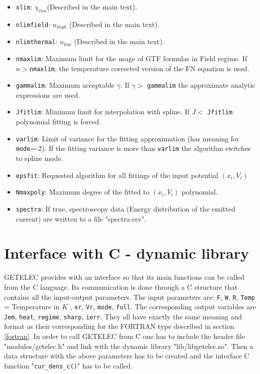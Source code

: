 \documentclass[notitlepage
]{revtex4-1}
\begin{document}
\begin{itemize}
	\item \texttt{xlim}:  $\chi_{lim}$(Described in the main text).
	\item \texttt{nlimfield}: $n_{high}$ (Described in the main text).
	\item \texttt{nlimthermal}: $n_{low}$ (Described in the main text).
	\item \texttt{nmaxlim}: Maximum limit for the usage of GTF formulas in Field regime. If $n>$\texttt{nmaxlim}, the temperature corrected version of the FN equation is used.
	\item \texttt{gammalim}: Maximum acceptable $\gamma$. If $\gamma>$ \texttt{gammalim} the approximate analytic expressions are used. 
	\item \texttt{Jfitlim}: Minimum limit for interpolation with spline. If $J<$ \texttt{Jfitlim} polynomial fitting is forced.
	\item \texttt{varlim}: Limit of variance for the fitting approximation (has meaning for \texttt{mode}=-2). If the fitting variance is more than \texttt{varlim} the algorithm switches to spline mode.
	\item \texttt{epsfit}: Requested algorithm for all fittings of the input potential $(x_i, V_i)$
	\item \texttt{Nmaxpoly}: Maximum degree of the fitted to $(x_i, V_i)$ polynomial.
	\item \texttt{spectra}: If true, spectroscopy data (Energy distribution of the emitted current) are written to a file "spectra.csv".   
\end{itemize}

\section{Interface with C - dynamic library}
\label{sec:C}

GETELEC provides with an interface so that its main functions can be called from the C language. Its communication is done through a C structure that contains all the input-output parameters. The input parameters are: \texttt{F}, \texttt{W}, \texttt{R}, \texttt{Temp} = Temperature in $K$ , \texttt{xr}, \texttt{Vr}, \texttt{mode}, \texttt{full}. The corresponding output variables are \texttt{Jem}, \texttt{heat}, \texttt{regime}, \texttt{sharp}, \texttt{ierr}. They all have exactly the same meaning and format as their corresponding for the FORTRAN type described in section \ref{fortran}. In order to call GETELEC from C one has to include the header file "modules/getelec.h" and link with the dynamic library "lib/libgetelec.so". Then a data structure with the above parameters has to be created and the interface C function "\texttt{cur\_dens\_c()}" has to be called. 
\end{document}
